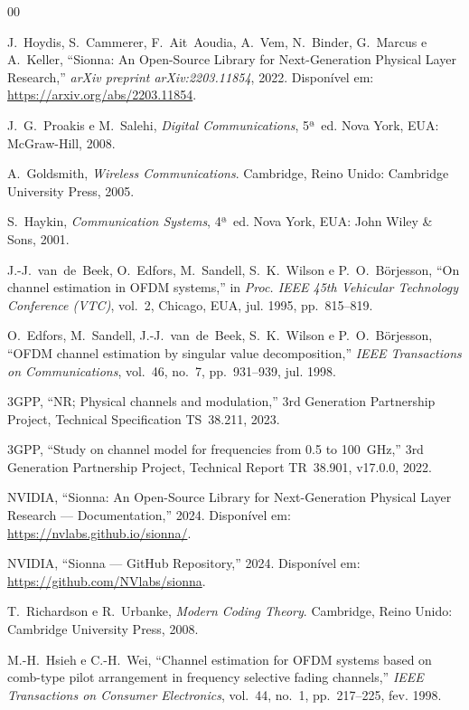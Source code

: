 \documentclass[conference]{IEEEtran}
\begin{document}
\begin{thebibliography}{00}

J.~Hoydis, S.~Cammerer, F.~Ait~Aoudia, A.~Vem, N.~Binder, G.~Marcus e A.~Keller, ``Sionna: An Open-Source Library for Next-Generation Physical Layer Research,'' \textit{arXiv preprint arXiv:2203.11854}, 2022. Disponível em: \url{https://arxiv.org/abs/2203.11854}.

J.~G.~Proakis e M.~Salehi, \textit{Digital Communications}, 5ª~ed. Nova York, EUA: McGraw-Hill, 2008.

A.~Goldsmith, \textit{Wireless Communications}. Cambridge, Reino Unido: Cambridge University Press, 2005.

S.~Haykin, \textit{Communication Systems}, 4ª~ed. Nova York, EUA: John Wiley \& Sons, 2001.

J.-J.~van~de~Beek, O.~Edfors, M.~Sandell, S.~K.~Wilson e P.~O.~Börjesson, ``On channel estimation in OFDM systems,'' in \textit{Proc. IEEE 45th Vehicular Technology Conference (VTC)}, vol.~2, Chicago, EUA, jul. 1995, pp.~815--819.

O.~Edfors, M.~Sandell, J.-J.~van~de~Beek, S.~K.~Wilson e P.~O.~Börjesson, ``OFDM channel estimation by singular value decomposition,'' \textit{IEEE Transactions on Communications}, vol.~46, no.~7, pp.~931--939, jul. 1998.

3GPP, ``NR; Physical channels and modulation,'' 3rd Generation Partnership Project, Technical Specification TS~38.211, 2023.

3GPP, ``Study on channel model for frequencies from 0.5 to 100~GHz,'' 3rd Generation Partnership Project, Technical Report TR~38.901, v17.0.0, 2022.

NVIDIA, ``Sionna: An Open-Source Library for Next-Generation Physical Layer Research --- Documentation,'' 2024. Disponível em: \url{https://nvlabs.github.io/sionna/}.

NVIDIA, ``Sionna --- GitHub Repository,'' 2024. Disponível em: \url{https://github.com/NVlabs/sionna}.

T.~Richardson e R.~Urbanke, \textit{Modern Coding Theory}. Cambridge, Reino Unido: Cambridge University Press, 2008.

M.-H.~Hsieh e C.-H.~Wei, ``Channel estimation for OFDM systems based on comb-type pilot arrangement in frequency selective fading channels,'' \textit{IEEE Transactions on Consumer Electronics}, vol.~44, no.~1, pp.~217--225, fev. 1998.


\end{thebibliography}
\end{document}
